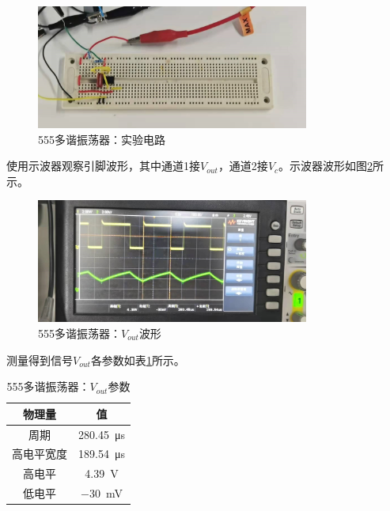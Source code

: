 \documentclass[UTF8]{ctexart}
\numberwithin{figure}{subsection}
\numberwithin{table}{subsection}
\numberwithin{equation}{subsection}
\begin{document}
\begin{figure}[H]
    \begin{center}
        \includegraphics[width=0.8\textwidth]{555/multiosci/circuit.jpg}
    \end{center}
    \caption{555多谐振荡器：实验电路}
    \label{multiosci exp cir}
\end{figure}

\par 使用示波器观察引脚波形，其中通道1接\(V_{out}\)，通道2接\(V_{c}\)。示波器波形如图\ref{multiosci vout osci}所示。

\begin{figure}[H]
    \begin{center}
        \includegraphics[width=0.8\textwidth]{555/multiosci/vout.jpg}
    \end{center}
    \caption{555多谐振荡器：\(V_{out}\)波形}
    \label{multiosci vout osci}
\end{figure}

测量得到信号\(V_{out}\)各参数如表\ref{multiosci vout table}所示。

\begin{table}
    \begin{center}
        \begin{tabular}{c | c}
            物理量 & 值 \\
            \hline
            周期 & \SI{280.45}{\micro\second} \\
            高电平宽度 & \SI{189.54}{\micro\second} \\
            高电平 & \SI{4.39}{\volt} \\
            低电平 & \SI{-30}{\milli\volt} \\
        \end{tabular}
        \label{multiosci vout table}
        \caption{555多谐振荡器：\(V_{out}\)参数}
    \end{center}
\end{table}
\end{document}
